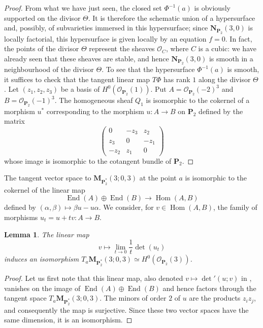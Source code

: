 \documentclass[12pt,english]{smfart}%
\theoremstyle{plain}
\newtheorem{lemma}[theorem]{Lemma}
\theoremstyle{definition}
\theoremstyle{remark}
\newcommand{\PP}{\mathbf{P}}
\newcommand{\Pd}{\PP_{2}^{*}}          %
\newcommand{\NN}{\mathbf{N}}           %
\newcommand{\MM}{\mathbf{M}}           %
\newcommand{\Oo}{\mathcal{O}}
\DeclareMathOperator{\Hom}{Hom}
\DeclareMathOperator{\End}{End}
\newcommand{\origpage}[1]{\marginnote{\scriptsize\itshape p.~#1}}
\begin{document}
\begin{proof}
From what we have just seen, the closed set $\Phi^{-1}(a)$ is obviously supported on the divisor $\Theta$. It is therefore the schematic union of a hypersurface and, possibly, of subvarieties immersed in this hypersurface; since $\NN_{\PP_2}(3,0)$ is locally factorial, this hypersurface is given locally by an equation $f=0$. In fact, the points of the divisor $\Theta$ represent the sheaves $\Oo_C$, where $C$ is a cubic: we have already seen that these sheaves are stable, and hence $\NN_{\PP_2}(3,0)$ is smooth in a neighbourhood of the divisor $\Theta$. To see that the hypersurface $\Phi^{-1}(a)$ is smooth, it suffices to check that the tangent linear map $T\Phi$ has rank $1$ along the divisor $\Theta$. Let $(z_1,z_2,z_3)$ be a basis of $H^0(\Oo_{\PP_2}(1))$. Put $A=\Oo_{\PP_2}(-2)^3$ and $B=\Oo_{\PP_2}(-1)^3$. The homogeneous sheaf $Q_1$ is isomorphic to the cokernel of a morphism $u^*$ corresponding to the morphism $u:A\to B$ on $\PP_2$ defined by the matrix
\[
\begin{pmatrix}
0 & -z_3 & z_2\\
z_3 & 0 & -z_1\\
-z_2 & z_1 & 0
\end{pmatrix}
\]
\origpage{660}%
whose image is isomorphic to the cotangent bundle of $\PP_2$.
\end{proof}

The tangent vector space to $\MM_{\Pd}(3;0,3)$ at the point $a$ is isomorphic to the cokernel of the linear map
\[
\End(A)\oplus \End(B) \longrightarrow \Hom(A,B)
\]
defined by $(\alpha,\beta)\mapsto \beta u - u\alpha$. We consider, for $v\in\Hom(A,B)$, the family of morphisms $u_t = u + tv : A\to B$.

\begin{lemma}\label{lem:det-prime}
The linear map
\[
v \longmapsto \lim_{t\to 0}\frac1t \det(u_t)
\]
induces an isomorphism $T_a\MM_{\Pd}(3;0,3)\simeq H^0(\Oo_{\PP_2}(3))$.
\end{lemma}

\begin{proof}
Let us first note that this linear map, also denoted $v\mapsto \det'(u;v)$ in , vanishes on the image of $\End(A)\oplus\End(B)$ and hence factors through the tangent space $T_a\MM_{\Pd}(3;0,3)$. The minors of order $2$ of $u$ are the products $z_iz_j$, and consequently the map is surjective. Since these two vector spaces have the same dimension, it is an isomorphism.
\end{proof}
\end{document}
